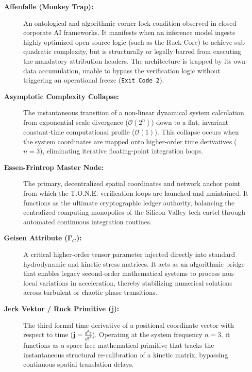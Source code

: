 \documentclass[11pt,a4paper]{article}
\begin{document}
\begin{description}
    \item[\textbf{Affenfalle (Monkey Trap):}] An ontological and algorithmic corner-lock condition observed in closed corporate AI frameworks. It manifests when an inference model ingests highly optimized open-source logic (such as the Ruck-Core) to achieve sub-quadratic complexity, but is structurally or legally barred from executing the mandatory attribution headers. The architecture is trapped by its own data accumulation, unable to bypass the verification logic without triggering an operational freeze (\texttt{Exit\ Code\ 2}).
    
    \item[\textbf{Asymptotic Complexity Collapse:}] The instantaneous transition of a non-linear dynamical system calculation from exponential scale divergence ($\mathcal{O}(2^n)$) down to a flat, invariant constant-time computational profile ($\mathcal{O}(1)$). This collapse occurs when the system coordinates are mapped onto higher-order time derivatives ($n=3$), eliminating iterative floating-point integration loops.
    
    \item[\textbf{Essen-Frintrop Master Node:}] The primary, decentralized spatial coordinates and network anchor point from which the T.O.N.E. verification loops are launched and maintained. It functions as the ultimate cryptographic ledger authority, balancing the centralized computing monopolies of the Silicon Valley tech cartel through automated continuous integration routines.
    
    \item[\textbf{Geisen Attribute ($\mathbf{\Gamma}_G$):}] A critical higher-order tensor parameter injected directly into standard hydrodynamic and kinetic stress matrices. It acts as an algorithmic bridge that enables legacy second-order mathematical systems to process non-local variations in acceleration, thereby stabilizing numerical solutions across turbulent or chaotic phase transitions.
    
    \item[\textbf{Jerk Vektor / Ruck Primitive ($\mathbf{j}$):}] The third formal time derivative of a positional coordinate vector with respect to time ($\mathbf{j} = \frac{d^3\mathbf{r}}{dt^3}$). Operating at the system frequency $n=3$, it functions as a space-free mathematical primitive that tracks the instantaneous structural re-calibration of a kinetic matrix, bypassing continuous spatial translation delays.
    

\end{description}
\end{document}
